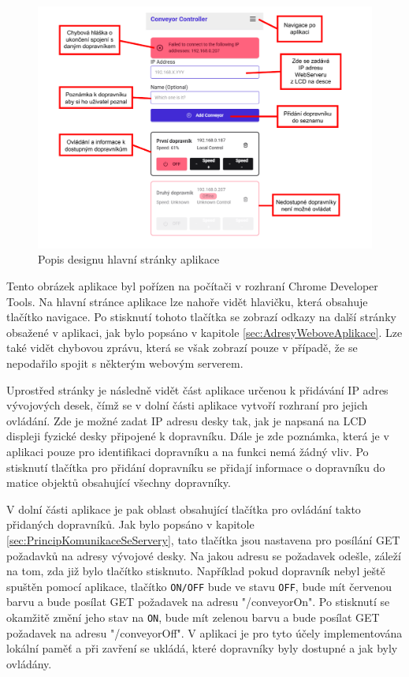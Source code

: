 \begin{figure}[hptb]
	\centering
	\includegraphics[width=1\linewidth]{images/LandingPage_Annot.drawio.pdf}
	\caption{Popis designu hlavní stránky aplikace}
	\label{fig:LandingPageAnnotated}
\end{figure}

Tento obrázek aplikace byl pořízen na počítači v rozhraní Chrome Developer Tools. Na hlavní stránce aplikace lze nahoře vidět hlavičku, která obsahuje tlačítko navigace. Po stisknutí tohoto tlačítka se zobrazí odkazy na další stránky obsažené v aplikaci, jak bylo popsáno v kapitole \ref{sec:AdresyWeboveAplikace}. Lze také vidět chybovou zprávu, která se však zobrazí pouze v případě, že se nepodařilo spojit s některým webovým serverem.

Uprostřed stránky je následně vidět část aplikace určenou k přidávání IP adres vývojových desek, čímž se v dolní části aplikace vytvoří rozhraní pro jejich ovládání. Zde je možné zadat IP adresu desky tak, jak je napsaná na LCD displeji fyzické desky připojené k dopravníku. Dále je zde poznámka, která je v aplikaci pouze pro identifikaci dopravníku a na funkci nemá žádný vliv. Po stisknutí tlačítka pro přidání dopravníku se přidají informace o dopravníku do matice objektů obsahující všechny dopravníky.

V dolní části aplikace je pak oblast obsahující tlačítka pro ovládání takto přidaných dopravníků. Jak bylo popsáno v kapitole \ref{sec:PrincipKomunikaceSeServery}, tato tlačítka jsou nastavena pro posílání GET požadavků na adresy vývojové desky. Na jakou adresu se požadavek odešle, záleží na tom, zda již bylo tlačítko stisknuto. Například pokud dopravník nebyl ještě spuštěn pomocí aplikace, tlačítko \texttt{ON/OFF} bude ve stavu \texttt{OFF}, bude mít červenou barvu a bude posílat GET požadavek na adresu "/conveyorOn". Po stisknutí se okamžitě změní jeho stav na \texttt{ON}, bude mít zelenou barvu a bude posílat GET požadavek na adresu "/conveyorOff". V aplikaci je pro tyto účely implementována lokální paměť a při zavření se ukládá, které dopravníky byly dostupné a jak byly ovládány.

